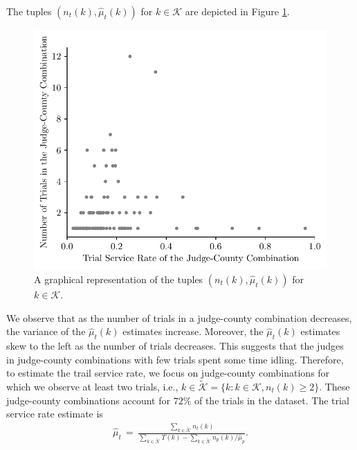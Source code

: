 \documentclass[11pt]{article}
\theoremstyle{ModifiedStyle}
\begin{document}
      The tuples $(n_t(k),{\hat{\mu}_t(k)})$ for $k\in\mathcal{K}$ are depicted in Figure \ref{Figure_Trial_Sercice_Rate_Vs_Trial_Per_County}.
			\begin{figure}[H]
				\centering
				\includegraphics[scale=0.75]{Figures/Judge_Capacity_Vs_Number_of_Trials}
				\vspace{-2mm}
				\caption{A graphical representation of the tuples $(n_t(k),{\hat{\mu}_t(k)})$ for $k\in\mathcal{K}$.}
				\label{Figure_Trial_Sercice_Rate_Vs_Trial_Per_County}
			\end{figure}
			We observe that as the number of trials in a judge-county combination decreases, the variance of the $\hat{\mu}_t(k)$ estimates increase. Moreover, the $\hat{\mu}_t(k)$ estimates skew to the left as the number of trials decreases. This suggests that the judges in judge-county combinations with few trials spent some time idling. Therefore, to estimate the trail service rate, we focus on judge-county combinations for which we observe at least two trials, i.e., $k \in \tilde{\mathcal{K}} = \{k:k\in\mathcal{K},n_t(k)\geq 2\}$. These judge-county combinations account for $72\%$ of the trials in the dataset. The trial service rate estimate is
			\begin{align*}
				\hat{\mu}_t \,=\, \frac{ \sum\limits_{k\in\tilde{\mathcal{K}}} n_t(k) }{\sum\limits_{k\in\tilde{\mathcal{K}}} T(k) - \sum\limits_{k\in\tilde{\mathcal{K}}} n_p(k) / \hat{\mu}_p }.
			\end{align*}
\end{document}
